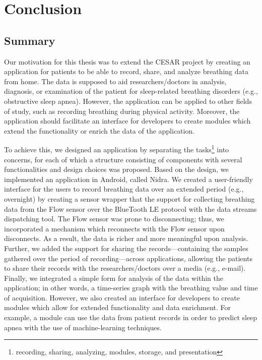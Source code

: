 \chapter{Conclusion}

\section{Summary}
Our motivation for this thesis was to extend the CESAR project by creating an application for patients to be able to record, share, and analyze breathing data from home. The data is supposed to aid researchers/doctors in analysis, diagnosis, or examination of the patient for sleep-related breathing disorders (e.g., obstructive sleep apnea). However, the application can be applied to other fields of study, such as recording breathing during physical activity. Moreover, the application should facilitate an interface for developers to create modules which extend the functionality or enrich the data of the application.

To achieve this, we designed an application by separating the tasks\footnote{recording, sharing, analyzing, modules, storage, and presentation} into concerns, for each of which a structure consisting of components with several functionalities and design choices was proposed. Based on the design, we implemented an application in Android, called Nidra. We created a user-friendly interface for the users to record breathing data over an extended period (e.g., overnight) by creating a sensor wrapper that the support for collecting breathing data from the Flow sensor over the BlueTooth LE protocol with the data streams dispatching tool. The Flow sensor was prone to disconnecting; thus, we incorporated a mechanism which reconnects with the Flow sensor upon disconnects. As a result, the data is richer and more meaningful upon analysis. Further, we added the support for sharing the records---containing the samples gathered over the period of recording---across applications, allowing the patients to share their records with the researchers/doctors over a media (e.g., e-mail). Finally, we integrated a simple form for analysis of the data within the application; in other words, a time-series graph with the breathing value and time of acquisition. However, we also created an interface for developers to create modules which allow for extended functionality and data enrichment. For example, a module can use the data from patient records in order to predict sleep apnea with the use of machine-learning techniques.

